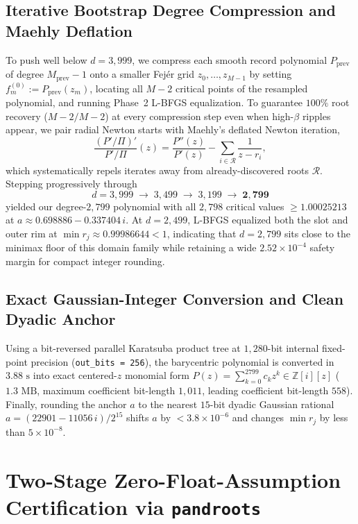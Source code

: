\documentclass[11pt,a4paper]{amsart}
\theoremstyle{remark}
\newcommand{\Z}{\mathbb{Z}}
\begin{document}
\subsection{Iterative Bootstrap Degree Compression and Maehly Deflation}
To push well below $d = 3{,}999$, we compress each smooth record polynomial
$P_{\mathrm{prev}}$ of degree $M_{\mathrm{prev}} - 1$ onto a smaller Fej\'er grid
$z_0, \dots, z_{M-1}$ by setting $f_m^{(0)} := P_{\mathrm{prev}}(z_m)$, locating
all $M - 2$ critical points of the resampled polynomial, and running Phase~2
L-BFGS equalization. To guarantee $100\%$ root recovery ($M - 2 / M - 2$) at
every compression step even when high-$\beta$ ripples appear, we pair radial
Newton starts with Maehly's deflated Newton iteration,
\[
  \frac{(P'/\Pi)'}{P'/\Pi}(z) = \frac{P''(z)}{P'(z)} - \sum_{i \in \mathcal{R}} \frac{1}{z - r_i},
\]
which systematically repels iterates away from already-discovered roots
$\mathcal{R}$. Stepping progressively through
\[
  d = 3{,}999 \;\longrightarrow\; 3{,}499 \;\longrightarrow\; 3{,}199 \;\longrightarrow\; \mathbf{2{,}799}
\]
yielded our degree-$2{,}799$ polynomial with all $2{,}798$ critical values
$\ge 1.00025213$ at $a \approx 0.698886 - 0.337404\,i$. At $d = 2{,}499$, L-BFGS
equalized both the slot and outer rim at $\min r_j \approx 0.99986644 < 1$,
indicating that $d = 2{,}799$ sits close to the minimax floor of this domain
family while retaining a wide $2.52 \times 10^{-4}$ safety margin for compact
integer rounding.

\subsection{Exact Gaussian-Integer Conversion and Clean Dyadic Anchor}
Using a bit-reversed parallel Karatsuba product tree at $1{,}280$-bit internal
fixed-point precision (\texttt{out\_bits = 256}), the barycentric polynomial is
converted in $3.88\text{ s}$ into exact centered-$z$ monomial form
$P(z) = \sum_{k=0}^{2799} c_k z^k \in \Z[i][z]$ ($1.3\text{ MB}$, maximum coefficient
bit-length $1{,}011$, leading coefficient bit-length $558$). Finally, rounding
the anchor $a$ to the nearest $15$-bit dyadic Gaussian rational
$a = (22901 - 11056\,i)/2^{15}$ shifts $a$ by $< 3.8 \times 10^{-6}$ and
changes $\min r_j$ by less than $5 \times 10^{-8}$.

\section{Two-Stage Zero-Float-Assumption Certification via \texttt{pandroots}}
\end{document}
